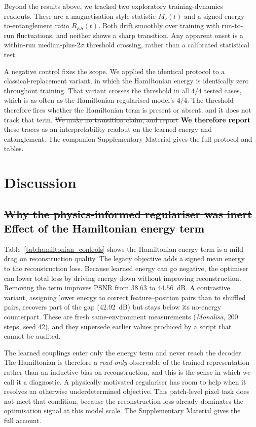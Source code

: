 \documentclass[pdflatex,sn-basic]{sn-jnl}
\newcommand{\del}[1]{\sout{#1}}
\newcommand{\add}[1]{\textbf{\textcolor{black}{#1}}}
\begin{document}
Beyond the results above, we tracked two exploratory training-dynamics readouts.
These are a magnetisation-style statistic $M_z(t)$ and a signed
energy-to-entanglement ratio $R_{ES}(t)$. Both drift smoothly over training with
run-to-run fluctuations, and neither shows a sharp transition. Any apparent onset
is a within-run median-plus-$2\sigma$ threshold crossing, rather than a
calibrated statistical test.

A negative control fixes the scope. We applied the identical protocol to a
classical-replacement variant, in which the Hamiltonian energy is identically
zero throughout training. That variant crosses the threshold in all $4/4$ tested
cases, which is as often as the Hamiltonian-regularised model's $4/4$. The
threshold therefore fires whether the Hamiltonian term is present or absent, and
it does not track that term. \del{We make no transition claim, and report} \add{We therefore report} these traces
as an interpretability readout on the learned energy and entanglement. The
companion Supplementary Material gives the full protocol and tables.

\section{Discussion}
\label{sec:discussion}

\subsection[Effect of the Hamiltonian energy term]{\del{Why the physics-informed regulariser was inert} \add{Effect of the Hamiltonian energy term}}
\label{sec:regularizer_inert}

Table~\ref{tab:hamiltonian_controls} shows the Hamiltonian energy term is a mild drag on reconstruction quality. The legacy objective adds a signed mean energy to the reconstruction loss. Because learned energy can go negative, the optimiser can lower total loss by driving energy down without improving reconstruction. Removing the term improves PSNR from $38.63$ to $44.56$~dB. A contrastive variant, assigning lower energy to correct feature--position pairs than to shuffled pairs, recovers part of the gap ($42.92$~dB) but stays below its no-energy counterpart. These are fresh same-environment measurements (\textit{Monalisa}, 200 steps, seed 42), and they supersede earlier values produced by a script that cannot be audited.

The learned couplings enter only the energy term and never reach the decoder. The Hamiltonian is therefore a \emph{read-only} observable of the trained representation rather than an inductive bias on reconstruction, and this is the sense in which we call it a diagnostic. A physically motivated regulariser has room to help when it resolves an otherwise underdetermined objective. This patch-level pixel task does not meet that condition, because the reconstruction loss already dominates the optimisation signal at this model scale. The Supplementary Material gives the full account.
\end{document}

